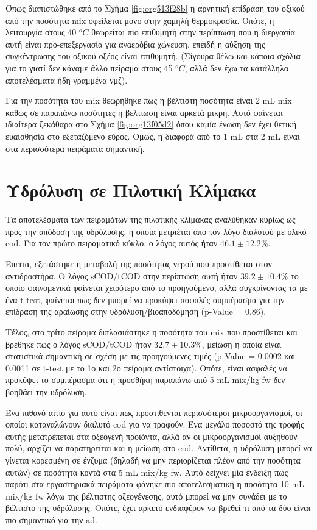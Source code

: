 \documentclass[11pt]{report}
\begin{document}
Όπως διαπιστώθηκε από το Σχήμα \ref{fig:org513f28b} η αρνητική επίδραση του οξικού από την ποσότητα \acrshort{mix} οφείλεται μόνο στην χαμηλή θερμοκρασία. Οπότε, η λειτουργία στους 40 \(^oC\) θεωρείται πιο επιθυμητή στην περίπτωση που η διεργασία αυτή είναι προ-επεξεργασία για αναερόβια χώνευση, επειδή η αύξηση της συγκέντρωσης του οξικού οξέος είναι επιθυμητή. (Σίγουρα θέλω και κάποια σχόλια για το γιατί δεν κάναμε άλλο πείραμα στους 45 \(^oC\), αλλά δεν έχω τα κατάλληλα αποτελέσματα ήδη γραμμένα νμζ).

Για την ποσότητα του \acrshort{mix} θεωρήθηκε πως η βέλτιστη ποσότητα είναι 2 mL \acrshort{mix} καθώς σε παραπάνω ποσότητες η βελτίωση είναι αρκετά μικρή. Αυτό φαίνεται ιδιαίτερα ξεκάθαρα στο Σχήμα \ref{fig:org13f05d2} όπου καμία ένωση δεν έχει θετική ευαισθησία στο εξεταζόμενο εύρος. Όμως, η διαφορά από το 1 mL στα 2 mL είναι στα περισσότερα πειράματα σημαντική.

\section{Υδρόλυση σε Πιλοτική Κλίμακα}
\label{sec:org66ace0e}
Τα αποτελέσματα των πειραμάτων της πιλοτικής κλίμακας αναλύθηκαν κυρίως ως προς την απόδοση της υδρόλυσης, η οποία μετριέται από τον λόγο διαλυτού με ολικό \acrshort{cod}. Για τον πρώτο πειραματικό κύκλο, ο λόγος αυτός ήταν \(46.1 \pm 12.2 \%\).

Έπειτα, εξετάστηκε η μεταβολή της ποσότητας νερού που προστίθεται στον αντιδραστήρα. Ο λόγος sCOD/tCOD στην περίπτωση αυτή ήταν \(39.2 \pm 10.4 \%\) το οποίο φαινομενικά φαίνεται χειρότερο από το προηγούμενο, αλλά συγκρίνοντας τα με ένα t-test, φαίνεται πως δεν μπορεί να προκύψει ασφαλές συμπέρασμα για την επίδραση της αραίωσης στην υδρόλυση/βιοαποδόμηση (p-Value = 0.86). 

Τέλος, στο τρίτο πείραμα διπλασιάστηκε η ποσότητα του \acrshort{mix} που προστίθεται και βρέθηκε πως ο λόγος sCOD/tCOD ήταν \(32.7 \pm 10.3 \%\), μείωση η οποία είναι στατιστικά σημαντική σε σχέση με τις προηγούμενες τιμές (p-Value = 0.0002 και 0.0011 σε t-test με το 1ο και 2ο πείραμα αντίστοιχα). Οπότε, είναι ασφαλές να προκύψει το συμπέρασμα ότι η προσθήκη παραπάνω από 5 mL \acrshort{mix}/kg \acrshort{fw} δεν βοηθάει την υδρόλυση.

Ένα πιθανό αίτιο για αυτό είναι πως προστίθενται περισσότεροι μικροοργανισμοί, οι οποίοι καταναλώνουν διαλυτό \acrshort{cod} για να τραφούν. Ένα μεγάλο ποσοστό της τροφής αυτής μετατρέπεται στα οξεογενή προϊόντα, αλλά αν οι μικροοργανισμοί αυξηθούν πολύ, αρχίζει να παρατηρείται και η μείωση στο \acrshort{cod}. Αντίθετα, η υδρόλυση μπορεί να γίνεται κορεσμένη σε ένζυμα (δηλαδή να μην περιορίζεται πλέον από την ποσότητα αυτών) σε ποσότητα κοντά στα 5 mL \acrshort{mix}/kg \acrshort{fw}. Αυτό δείχνει μία ένδειξη πως παρότι στα εργαστηριακά πειράματα φάνηκε πιο αποτελεσματική η ποσότητα 10 mL \acrshort{mix}/kg \acrshort{fw} λόγω της βέλτιστης οξεογένεσης, αυτό μπορεί να μην συνάδει με το βέλτιστο της υδρόλυσης. Οπότε, έχει αρκετό ενδιαφέρον να βρεθεί τι από τα δύο είναι πιο σημαντικό για την \acrshort{ad}.
\end{document}
